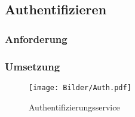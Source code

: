 \subsection{Authentifizieren}
\label{sec:auth}


\subsubsection{Anforderung}
\label{sec:auth_anforderung}


\subsubsection{Umsetzung}
\label{sec:auth_umsetzung}

\begin{figure}[H]
\centering
\texttt{[image: Bilder/Auth.pdf]}
\caption{Authentifizierungsservice\label{fig:authservice}}
\end{figure}